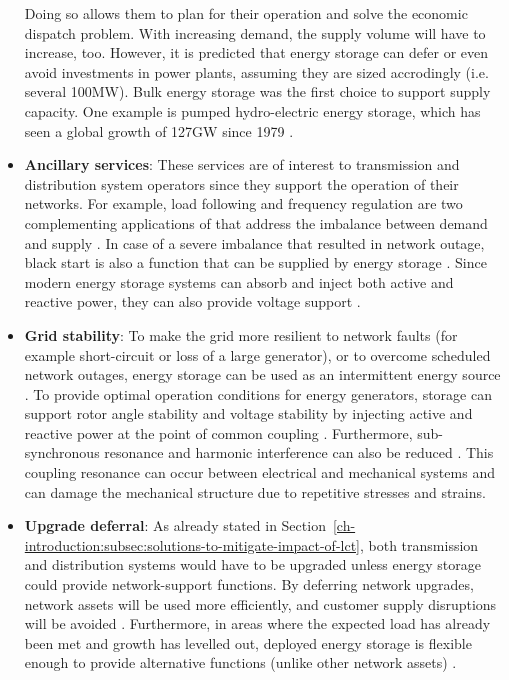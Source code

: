 \begin{itemize}
Doing so allows them to plan for their operation and solve the economic dispatch problem.
With increasing demand, the supply volume will have to increase, too.
However, it is predicted that energy storage can defer or even avoid investments in power plants, assuming they are sized accrodingly (i.e. several 100MW)\cite{Dobie1998}.
Bulk energy storage was the first choice to support supply capacity.
One example is pumped hydro-electric energy storage, which has seen a global growth of 127GW since 1979 \cite{Rehman2015, Barbour2015, Barbour2016}.
\item
\textbf{Ancillary services}: These services are of interest to transmission and distribution system operators since they support the operation of their networks.
For example, load following and frequency regulation are two complementing applications of that address the imbalance between demand and supply \cite{Bevrani2011}.
In case of a severe imbalance that resulted in network outage, black start is also a function that can be supplied by energy storage \cite{Cole1995, Kashem2007}.
Since modern energy storage systems can absorb and inject both active and reactive power, they can also provide voltage support \cite{Kulkarni2005}.
\item
\textbf{Grid stability}: To make the grid more resilient to network faults (for example short-circuit or loss of a large generator), or to overcome scheduled network outages, energy storage can be used as an intermittent energy source \cite{Kundur1993}.
To provide optimal operation conditions for energy generators, storage can support rotor angle stability and voltage stability by injecting active and reactive power at the point of common coupling \cite{Chakraborty2012, Kolluri2002}.
Furthermore, sub-synchronous resonance and harmonic interference can also be reduced \cite{Wang1994}.
This coupling resonance can occur between electrical and mechanical systems and can damage the mechanical structure due to repetitive stresses and strains.
\item
\textbf{Upgrade deferral}: As already stated in Section~\ref{ch-introduction:subsec:solutions-to-mitigate-impact-of-lct}, both transmission and distribution systems would have to be upgraded unless energy storage could provide network-support functions.
By deferring network upgrades, network assets will be used more efficiently, and customer supply disruptions will be avoided \cite{Sayer2007, Eyer2010a}.
Furthermore, in areas where the expected load has already been met and growth has levelled out, deployed energy storage is flexible enough to provide alternative functions (unlike other network assets) \cite{Huff2013}.

\end{itemize}
